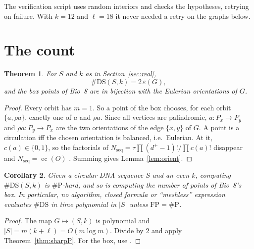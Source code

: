 \documentclass[11pt]{article}
\theoremstyle{plain}
\newtheorem{theorem}{Theorem}
\newtheorem{corollary}[theorem]{Corollary}
\theoremstyle{definition}
\theoremstyle{remark}
\newcommand{\DS}{\mathrm{DS}}
\newcommand{\Nseq}{N_{\mathrm{seq}}}
\newcommand{\ec}{\operatorname{ec}}
\newcommand{\sP}{\#\mathrm{P}}
\begin{document}
The verification script uses random interiors and checks the hypotheses, retrying on failure. With
$k=12$ and $\ell=18$ it never needed a retry on the graphs below.

\section{The count}\label{sec:count}

\begin{theorem}\label{thm:main}
For $S$ and $k$ as in Section~\ref{sec:real},
\[
\#\DS(S,k)=2\,\varepsilon(G),
\]
and the box points of Bio~8 are in bijection with the Eulerian orientations of $G$.
\end{theorem}

\begin{proof}
Every orbit has $m=1$. So a point of the box chooses, for each orbit $\{a,\rho a\}$, exactly one of $a$
and $\rho a$. Since all vertices are palindromic, $a\colon P_x\to P_y$ and $\rho a\colon P_y\to P_x$
are the two orientations of the edge $\{x,y\}$ of $G$. A point is a circulation iff the chosen
orientation is balanced, i.e.\ Eulerian. At it, $c(a)\in\{0,1\}$, so the factorials of
$\Nseq=\tau\prod(d^+-1)!/\prod c(a)!$ disappear and $\Nseq=\ec(O)$ \cite{Bio8}. Summing gives
Lemma~\ref{lem:orient}.
\end{proof}

\begin{corollary}\label{cor:hard}
Given a circular DNA sequence $S$ and an even $k$, computing $\#\DS(S,k)$ is $\sP$-hard, and so is
computing the number of points of Bio~8's box. In particular, no algorithm, closed formula or
``meshless'' expression evaluates $\#\DS$ in time polynomial in $|S|$ unless $\mathrm{FP}=\sP$.
\end{corollary}

\begin{proof}
The map $G\mapsto(S,k)$ is polynomial and $|S|=m(k+\ell)=O(m\log m)$. Divide by $2$ and apply
Theorem~\ref{thm:sharpP}. For the box, use \cite{MW96}.
\end{proof}
\end{document}
